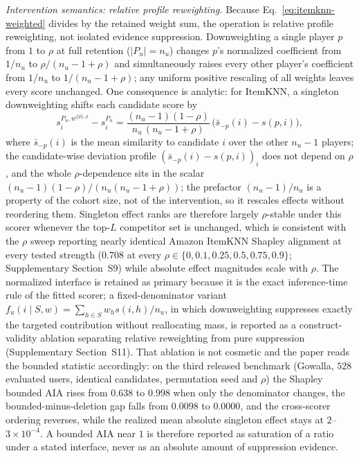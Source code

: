 \documentclass[manuscript,screen,review,anonymous]{acmart}
\begin{document}
\emph{Intervention semantics: relative profile reweighting.} Because Eq.~\eqref{eq:itemknn-weighted} divides by the retained weight sum, the operation is relative profile reweighting, not isolated evidence suppression. Downweighting a single player $p$ from $1$ to $\rho$ at full retention ($|P_u|=n_u$) changes $p$'s normalized coefficient from $1/n_u$ to $\rho/(n_u-1+\rho)$ and simultaneously raises every other player's coefficient from $1/n_u$ to $1/(n_u-1+\rho)$; any uniform positive rescaling of all weights leaves every score unchanged. One consequence is analytic: for ItemKNN, a singleton downweighting shifts each candidate score by
\begin{equation}
s_i^{P_u,w^{\{p\},\rho}}-s_i^{P_u}=\frac{(n_u-1)(1-\rho)}{n_u\,(n_u-1+\rho)}\,\big(\bar s_{-p}(i)-s(p,i)\big),
\label{eq:rho-factorization}
\end{equation}
where $\bar s_{-p}(i)$ is the mean similarity to candidate $i$ over the other $n_u-1$ players; the candidate-wise deviation profile $(\bar s_{-p}(i)-s(p,i))_i$ does not depend on $\rho$, and the whole $\rho$-dependence sits in the scalar $(n_u-1)(1-\rho)/(n_u(n_u-1+\rho))$; the prefactor $(n_u-1)/n_u$ is a property of the cohort size, not of the intervention, so it rescales effects without reordering them. Singleton effect ranks are therefore largely $\rho$-stable under this scorer whenever the top-$L$ competitor set is unchanged, which is consistent with the $\rho$ sweep reporting nearly identical Amazon ItemKNN Shapley alignment at every tested strength ($0.708$ at every $\rho\in\{0,0.1,0.25,0.5,0.75,0.9\}$; Supplementary Section~S9) while absolute effect magnitudes scale with $\rho$. The normalized interface is retained as primary because it is the exact inference-time rule of the fitted scorer; a fixed-denominator variant $f_u(i\mid S,w)=\sum_{h\in S}w_hs(i,h)/n_u$, in which downweighting suppresses exactly the targeted contribution without reallocating mass, is reported as a construct-validity ablation separating relative reweighting from pure suppression (Supplementary Section~S11). That ablation is not cosmetic and the paper reads the bounded statistic accordingly: on the third released benchmark (Gowalla, $528$ evaluated users, identical candidates, permutation seed and $\rho$) the Shapley bounded AIA rises from $0.638$ to $0.998$ when only the denominator changes, the bounded-minus-deletion gap falls from $0.0098$ to $0.0000$, and the cross-scorer ordering reverses, while the realized mean absolute singleton effect stays at $2$--$3\times10^{-4}$. A bounded AIA near $1$ is therefore reported as saturation of a ratio under a stated interface, never as an absolute amount of suppression evidence.
\end{document}
